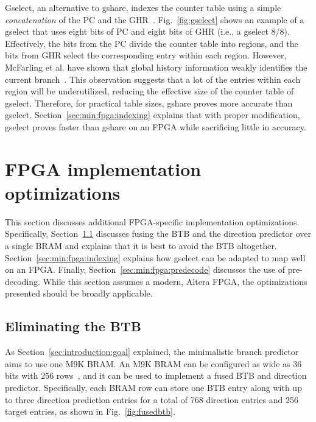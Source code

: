 Gselect, an alternative to gshare, indexes the counter table using a simple \textit{concatenation} of the PC and the GHR~\cite{McFarling}. Fig.~\ref{fig:gselect} shows an example of a gselect that uses eight bits of PC and eight bits of GHR (i.e., a gselect 8/8). Effectively, the bits from the PC divide the counter table into regions, and the bits from GHR select the corresponding entry within each region. However, McFarling et al. have shown that global history information weakly identifies the current branch~\cite{McFarling}. This observation suggests that a lot of the entries within each region will be underutilized, reducing the effective size of the counter table of gselect. Therefore, for practical table sizes, gshare proves more accurate than gselect. Section~\ref{sec:min:fpga:indexing} explains that with proper modification, gselect proves faster than gshare on an FPGA while sacrificing little in accuracy.

\section{FPGA implementation optimizations}
\label{sec:min:fpga}
This section discusses additional FPGA-specific implementation optimizations. Specifically, Section~\ref{sec:min:fpga:nobtb} discusses fusing the BTB and the direction predictor over a single BRAM and explains that it is best to avoid the BTB altogether. Section~\ref{sec:min:fpga:indexing} explains how gselect can be adapted to map well on an FPGA. Finally, Section~\ref{sec:min:fpga:predecode} discusses the use of pre-decoding. While this section assumes a modern, Altera FPGA, the optimizations presented should be broadly applicable.

\subsection{Eliminating the BTB}
\label{sec:min:fpga:nobtb}
As Section~\ref{sec:introduction:goal} explained, the minimalistic branch predictor aims to use one M9K BRAM. An M9K BRAM can be configured as wide as 36 bits with 256 rows~\cite{StratixIVM9K}, and it can be used to implement a fused BTB and direction predictor. Specifically, each BRAM row can store one BTB entry along with up to three direction prediction entries for a total of 768 direction entries and 256 target entries, as shown in Fig.~\ref{fig:fusedbtb}.

